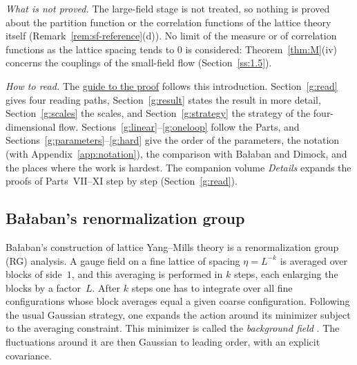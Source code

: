 \emph{What is not proved.} The large-field stage is not treated, so nothing is proved about the partition function or the correlation functions of the lattice theory itself (Remark~\ref{rem:sf-reference}(d)). No limit of the measure or of correlation functions as the lattice spacing tends to $0$ is considered: Theorem~\ref{thm:M}(iv) concerns the couplings of the small-field flow (Section~\ref{ss:1.5}).

\emph{How to read.} The \hyperref[guide]{guide to the proof} follows this introduction. Section~\ref{g:read} gives four reading paths, Section~\ref{g:result} states the result in more detail, Section~\ref{g:scales} the scales, and Section~\ref{g:strategy} the strategy of the four-dimensional flow. Sections~\ref{g:linear}--\ref{g:oneloop} follow the Parts, and Sections~\ref{g:parameters}--\ref{g:hard} give the order of the parameters, the notation (with Appendix~\ref{app:notation}), the comparison with Ba\l aban and Dimock, and the places where the work is hardest. The companion volume \emph{Details} expands the proofs of Parts~VII--XI step by step (Section~\ref{g:read}).

\subsection{Ba\l aban's renormalization group}\label{ss:1.1}

Ba\l aban's construction of lattice Yang--Mills theory \cite{BalPropI,BalPropII,BalAvg,BalReg,BalBackground,BalVar,BalUV3,BalYM4I,BalYM4II} is a renormalization group (RG) analysis. A gauge field on a fine lattice of spacing $\eta=L^{-k}$ is averaged over blocks of side~$1$, and this averaging is performed in $k$ steps, each enlarging the blocks by a factor~$L$. After $k$ steps one has to integrate over all fine configurations whose block averages equal a given coarse configuration. Following the usual Gaussian strategy, one expands the action around its minimizer subject to the averaging constraint. This minimizer is called the \emph{background field} \cite{BalVar}. The fluctuations around it are then Gaussian to leading order, with an explicit covariance.

